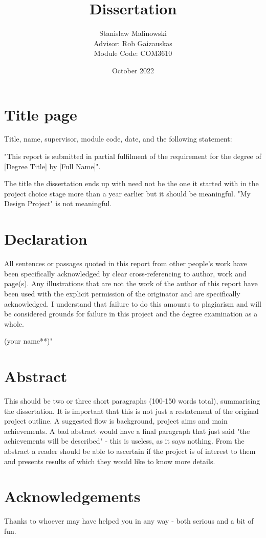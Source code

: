 \documentclass{article}
\title{Dissertation}
\author{Stanislaw Malinowski
\\[1cm]{\small Advisor: Rob Gaizauskas}
\\[1cm]{\small Module Code: COM3610}
}
\date{October 2022}
\begin{document}
\maketitle
\section{Title page}
Title, name, supervisor, module code, date, and the following statement:    

"This report is submitted in partial fulfilment of the requirement for the degree of [Degree Title] by [Full Name]".   

The title the dissertation ends up with need not be the one it started with in the project choice stage more than a year earlier but it should be meaningful.  "My Design Project" is not meaningful.
\blindtext
\newpage

\section{Declaration}
All sentences or passages quoted in this report from other people's work have been specifically acknowledged by clear cross-referencing to author, work and page(s). Any illustrations that are not the work of the author of this report have been used with the explicit permission of the originator and are specifically acknowledged. I understand that failure to do this amounts to plagiarism and will be considered grounds for failure in this project and the degree examination as a whole.

(your name**)"
\blindtext
\newpage

\section{Abstract}
This should be two or three short paragraphs (100-150 words total), summarising the dissertation. It is important that this is not just a restatement of the original project outline. A suggested flow is background, project aims and main achievements. A bad abstract would have a final paragraph that just said "the achievements will be described" - this is useless, as it says nothing. From the abstract a reader should be able to ascertain if the project is of interest to them and presents results of which they would like to know more details.
\blindtext
\newpage

\section{Acknowledgements}
Thanks to whoever may have helped you in any way - both serious and a bit of fun.
\blindtext
\end{document}
